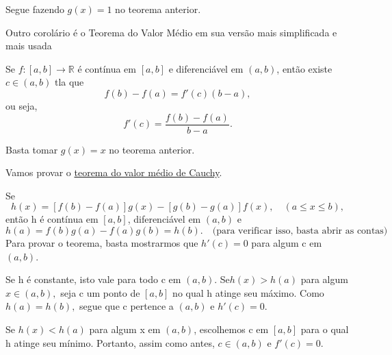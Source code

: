 \documentclass[Analysis/analysis_notes.tex]{subfiles}
\begin{document}
\begin{proof*}
	Segue fazendo \(g(x) = 1\) no teorema anterior. \qedsymbol
\end{proof*}
Outro corolário é o Teorema do Valor Médio em sua versão mais simplificada e mais usada
\hypertarget{mean_value}{
	\begin{crl*}
		Se \(f:[a, b]\rightarrow \mathbb{R}\) é contínua em \([a, b]\) e diferenciável em
		\((a, b)\), então existe \(c\in (a, b)\) tla que
		\[
			f(b) - f(a) = f'(c)(b-a),
		\]
		ou seja,
		\[
			f'(c) = \frac{f(b)-f(a)}{b-a}.
		\]
	\end{crl*}}
\begin{proof*}
	Basta tomar \(g(x) = x\) no teorema anterior. \qedsymbol
\end{proof*}
Vamos provar o \hyperlink{cauchy_mvt}{teorema do valor médio de Cauchy}.
\begin{proof*}
	Se
	\[
		h(x) = [f(b)-f(a)]g(x) - [g(b)-g(a)]f(x),\quad (a\leq x\leq b),
	\]
	então h é contínua em \([a, b]\), diferenciável em \((a, b)\) e
	\[
		h(a) = f(b)g(a) - f(a)g(b) = h(b).\quad \text{(para verificar isso, basta abrir as contas)}
	\]
	Para provar o teorema, basta mostrarmos que \(h'(c) = 0\) para algum c em \((a, b)\).

	Se h é constante, isto vale para todo c em \((a, b).\)
	Se\(h(x) > h(a)\) para algum \( x\in (a, b),\) seja c um ponto de \([a, b]\)
	no qual h atinge seu máximo. Como \(h(a) = h(b),\) segue que c pertence a \((a, b)\) e \(h'(c) = 0\).

	Se \(h(x) < h(a)\) para algum x em \((a, b)\), escolhemos c em \([a, b]\)
	para o qual h atinge seu mínimo. Portanto, assim como antes, \(c\in (a, b)\) e
	\(f'(c) = 0.\) \qedsymbol
\end{proof*}
\end{document}
